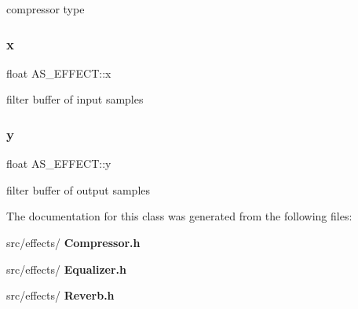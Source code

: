 compressor type \mbox{\label{class_a_s___e_f_f_e_c_t_a9748e96f0ca26fb550a3b3b0bcd93004}} 
\subsubsection{x}
{\footnotesize\ttfamily float A\+S\+\_\+\+E\+F\+F\+E\+C\+T\+::x\hspace{0.3cm}{\ttfamily [private]}}

filter buffer of input samples \mbox{\label{class_a_s___e_f_f_e_c_t_a02d0facecf8adef8642d19c364d2211a}} 
\subsubsection{y}
{\footnotesize\ttfamily float A\+S\+\_\+\+E\+F\+F\+E\+C\+T\+::y\hspace{0.3cm}{\ttfamily [private]}}

filter buffer of output samples 

The documentation for this class was generated from the following files\+:\begin{DoxyCompactItemize}
\item 
src/effects/\textbf{ Compressor.\+h}\item 
src/effects/\textbf{ Equalizer.\+h}\item 
src/effects/\textbf{ Reverb.\+h}\end{DoxyCompactItemize}
